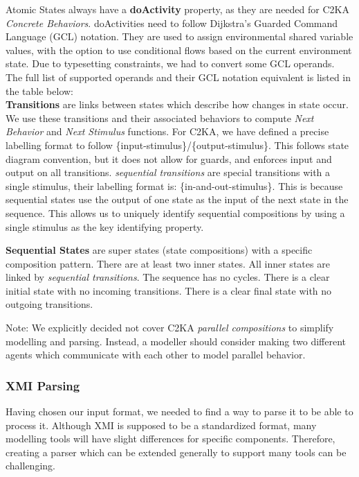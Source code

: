 \documentclass[11pt]{article}
\begin{document}
    Atomic States always have a \textbf{doActivity} property,
    as they are needed for C2KA \textit{Concrete Behaviors}.
    doActivities need to follow Dijkstra's Guarded Command Language (GCL) notation.
    They are used to assign environmental shared variable values,
    with the option to use conditional flows based on the current environment state.
    Due to typesetting constraints, we had to convert some GCL operands.
    The full list of supported operands and their GCL notation equivalent is listed in the table below:
    \\

    \textbf{Transitions} are links between states which describe how changes in state occur.
    We use these transitions and their associated behaviors to compute \textit{Next Behavior} and \textit{Next Stimulus} functions.
    For C2KA, we have defined a precise labelling format to follow \{input-stimulus\}/\{output-stimulus\}.
    This follows state diagram convention, but it does not allow for guards,
    and enforces input and output on all transitions.
    \textit{sequential transitions} are special transitions with a single stimulus, their labelling format is: \{in-and-out-stimulus\}.
    This is because sequential states use the output of one state as the input of the next state in the sequence.
    This allows us to uniquely identify sequential compositions by using a single stimulus as the key identifying property.

    \textbf{Sequential States} are super states (state compositions) with a specific composition pattern.
    There are at least two inner states.
    All inner states are linked by \textit{sequential transitions}.
    The sequence has no cycles.
    There is a clear initial state with no incoming transitions.
    There is a clear final state with no outgoing transitions.

    Note: We explicitly decided not cover C2KA \textit{parallel compositions} to simplify modelling and parsing.
    Instead, a modeller should consider making two different agents which communicate
    with each other to model parallel behavior.

    \subsubsection{XMI Parsing}\label{subsubsec:parsing}
    Having chosen our input format, we needed to find a way to parse it to be able to process it.
    Although XMI is supposed to be a standardized format,
    many modelling tools will have slight differences for specific components.
    Therefore, creating a parser which can be extended generally to support many tools can be challenging.
\end{document}
